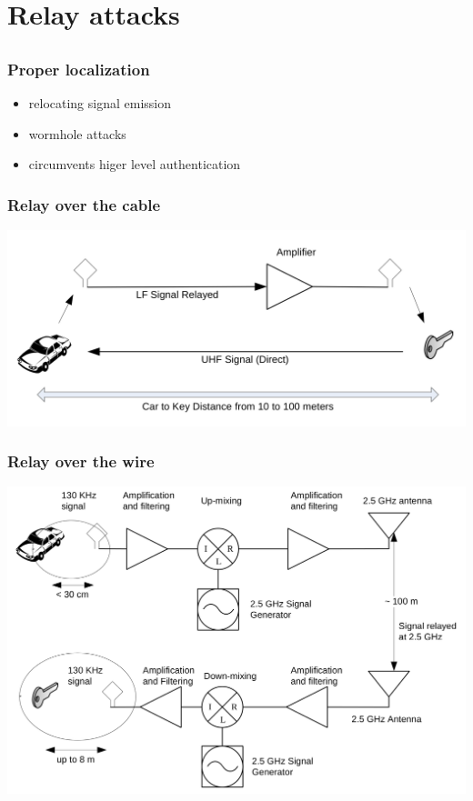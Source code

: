 \documentclass[12pt]{beamer}
\begin{document}
\section{Relay attacks}
\subsection*{}
	\begin{frame}
	\frametitle{Proper localization}
		\begin{itemize}
			\item relocating signal emission
			\item wormhole attacks
			\item circumvents higer level authentication
		\end{itemize}
	\end{frame}
	
	\begin{frame}
	\frametitle{Relay over the cable}
		\begin{center}
			\includegraphics[scale=0.85]{img/franc_relay_over_the_wire.png} 
		\end{center}
	\end{frame}
	
	\begin{frame}
		\frametitle{Relay over the wire}
		\begin{center}
			\includegraphics[scale=0.75]{img/franc_relay_over_the_air.png} 	
		\end{center}
	\end{frame}
\end{document}
